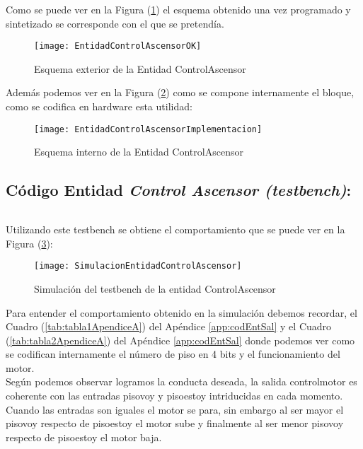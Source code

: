 	Como se puede ver en la Figura (\ref{fig:EntidadControlAscensorOK}) el esquema obtenido una vez programado y sintetizado se corresponde con el que se pretendía.
    \begin{figure}[H]
		    \centering
		    \texttt{[image: EntidadControlAscensorOK]}
		    \caption{Esquema exterior de la Entidad ControlAscensor}
		    \label{fig:EntidadControlAscensorOK}
	\end{figure}
    Además podemos ver en la Figura (\ref{fig:EntidadControlAscensorImplementacion}) como se compone internamente el bloque, como se codifica en hardware esta utilidad:
    \begin{figure}[H]
		    \centering
		    \texttt{[image: EntidadControlAscensorImplementacion]}
		    \caption{Esquema interno de la Entidad ControlAscensor}
		    \label{fig:EntidadControlAscensorImplementacion}
	\end{figure}

\subsection{Código Entidad \textit{Control Ascensor (testbench)}:} \label{code:ControlAscensor_tb}
	\inputminted[frame=lines,fontsize=\footnotesize,linenos]{vhdl}{CodeFiles/EntidadControlAscensor_tb.vhd}

    Utilizando este testbench se obtiene el comportamiento que se puede ver en la Figura (\ref{fig:SimulacionEntidadControlAscensor}):

    \begin{figure}[H]
		    \centering
		    \texttt{[image: SimulacionEntidadControlAscensor]}
		    \caption{Simulación del testbench de la entidad ControlAscensor}
		    \label{fig:SimulacionEntidadControlAscensor}
	\end{figure}

	Para entender el comportamiento obtenido en la simulación debemos recordar, el Cuadro (\ref{tab:tabla1ApendiceA}) del Apéndice \ref{app:codEntSal} y el Cuadro (\ref{tab:tabla2ApendiceA}) del Apéndice \ref{app:codEntSal} donde podemos ver como se codifican internamente el número de piso en 4 bits y el funcionamiento del motor. \\
	
	Según podemos observar logramos la conducta deseada, la salida controlmotor es coherente con las entradas pisovoy y pisoestoy intriducidas en cada momento. Cuando las entradas son iguales el motor se para, sin embargo al ser mayor el pisovoy respecto de pisoestoy el motor sube y  finalmente al ser menor pisovoy respecto de pisoestoy el motor baja.

